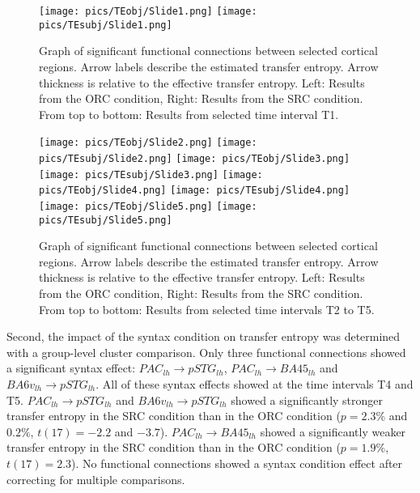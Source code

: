 \vspace{5mm}


\begin{figure}[h]
\begin{center}
\vspace{7mm}
\texttt{[image: pics/TEobj/Slide1.png]}
\texttt{[image: pics/TEsubj/Slide1.png]}
\caption{\label{4.4.networkgraph.a} Graph of significant functional connections between selected cortical regions. Arrow labels describe the estimated transfer entropy. Arrow thickness is relative to the effective transfer entropy. Left: Results from the ORC condition, Right: Results from the SRC condition. From top to bottom: Results from selected time interval T1.}
\end{center}
\end{figure}

\begin{figure}[h]
\begin{center}
\vspace{7mm}
\texttt{[image: pics/TEobj/Slide2.png]}
\texttt{[image: pics/TEsubj/Slide2.png]}
\texttt{[image: pics/TEobj/Slide3.png]}
\texttt{[image: pics/TEsubj/Slide3.png]}
\texttt{[image: pics/TEobj/Slide4.png]}
\texttt{[image: pics/TEsubj/Slide4.png]}
\texttt{[image: pics/TEobj/Slide5.png]}
\texttt{[image: pics/TEsubj/Slide5.png]}
\caption{\label{4.4.networkgraph.b} Graph of significant functional connections between selected cortical regions. Arrow labels describe the estimated transfer entropy. Arrow thickness is relative to the effective transfer entropy. Left: Results from the ORC condition, Right: Results from the SRC condition. From top to bottom: Results from selected time intervals T2 to T5.}
\end{center}
\end{figure}


Second, the impact of the syntax condition on transfer entropy was determined with a group-level cluster comparison.
Only three functional connections showed a significant syntax effect: $PAC_{lh} \rightarrow pSTG_{lh}$, $PAC_{lh} \rightarrow BA45_{lh}$ and $BA6v_{lh} \rightarrow pSTG_{lh}$.
All of these syntax effects showed at the time intervals T4 and T5.
$PAC_{lh} \rightarrow pSTG_{lh}$ and $BA6v_{lh} \rightarrow pSTG_{lh}$ showed a significantly stronger transfer entropy in the SRC condition than in the ORC condition ($p = 2.3\%$ and $0.2\%$, $t(17) = -2.2$ and $-3.7$).
$PAC_{lh} \rightarrow BA45_{lh}$ showed a significantly weaker transfer entropy in the SRC condition than in the ORC condition ($p = 1.9\%$, $t(17) = 2.3$).
No functional connections showed a syntax condition effect after correcting for multiple comparisons.